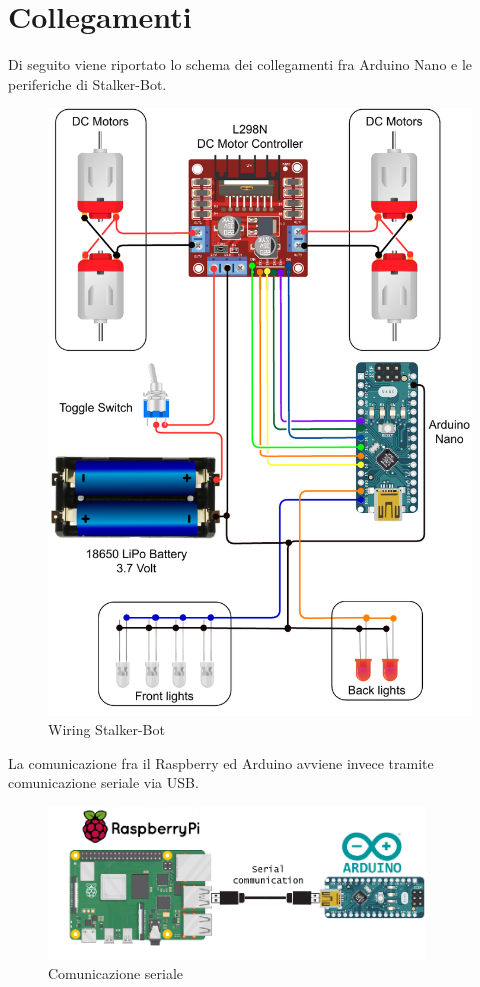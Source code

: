 \documentclass[12pt]{report}
\begin{document}
\newpage
\section{Collegamenti}

Di seguito viene riportato lo schema dei collegamenti fra Arduino Nano e le periferiche di Stalker-Bot.

\FloatBarrier
\begin{figure}[!h]
    \centering
    \includegraphics[width=12cm]{images/circuito.drawio.pdf}
    \caption{Wiring Stalker-Bot}
\end{figure}
\FloatBarrier

La comunicazione fra il Raspberry ed Arduino avviene invece tramite comunicazione seriale via USB.

\FloatBarrier
\begin{figure}[!h]
    \centering
    \includegraphics[width=10cm]{images/raspberry-arduino.pdf}
    \caption{Comunicazione seriale}
\end{figure}
\FloatBarrier
\end{document}
